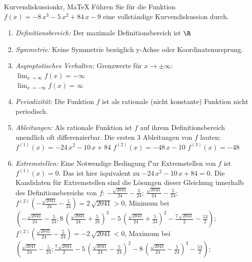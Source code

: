  \providecommand{\MoIl}{(} 
 \providecommand{\MoIr}{)}
 \providecommand{\MIntvlSep}{;} 
 \providecommand{\MElSetSep}{;} 
 \begin{MAufgabe}{Kurvendiskussion}{kr, MaTeX}
 F\"uhren Sie f\"ur die Funktion $f(x)= - 8\, x^3 - 5\, x^2 + 84\, x - 9$ eine vollst\"andige Kurvendiskussion durch.\\ 
 \ifLsg\Loesung
 \begin{enumerate}
 \item \emph{Definitionsbereich:} 
 Der maximale Definitionsbereich ist $\R$\item \emph{Symmetrie:} 
 Keine Symmetrie bez\"uglich y-Achse oder Koordinatenursprung.\item \emph{Asymptotisches Verhalten:} 
 Grenzwerte f\"ur $x\rightarrow \pm \infty$: \\ 
 $\lim_{x\rightarrow \infty} f(x)=- \infty$ \\ 
 $\lim_{x\rightarrow -\infty} f(x)=\infty$ \\ 
 \item \emph{Periodizit\"at:} 
 Die Funktion $f$ ist als rationale (nicht konstante) Funktion nicht periodisch.\item \emph{Ableitungen:} 
 Als rationale Funktion ist $f$ auf ihrem Definitionsbereich unendlich oft differenzierbar. 
 Die ersten 3 Ableitungen von $f$ lauten: \\ 
 $f^{(1)}(x)= - 24\, x^2 - 10\, x + 84$\newline 
  $f^{(2)}(x)= - 48\, x - 10$\newline 
  $f^{(3)}(x)=-48$\newline 
  \item \emph{Extremstellen:} 
 Eine Notwendige Bedingung f"ur Extremstellen von $f$ ist $f^{(1)}(x)=0$. 
 Das ist hier \"aquivalent zu $ - 24\, x^2 - 10\, x + 84=0$. 
 Die Kandidaten f\"ur Extremstellen sind die L\"osungen dieser Gleichung innerhalb des Definitionsbereichs von $f$: $ - \frac{\sqrt{2041}}{24} - \frac{5}{24}$; $\frac{\sqrt{2041}}{24} - \frac{5}{24}$; \\ 
 $f^{(2)}( - \frac{\sqrt{2041}}{24} - \frac{5}{24})=2\, \sqrt{2041}$$>0$, Minimum bei $( - \frac{\sqrt{2041}}{24} - \frac{5}{24};8\, {\left(\frac{\sqrt{2041}}{24} + \frac{5}{24}\right)}^3 - 5\, {\left(\frac{\sqrt{2041}}{24} + \frac{5}{24}\right)}^2 - \frac{7\, \sqrt{2041}}{2} - \frac{53}{2})$; \\ 
 $f^{(2)}(\frac{\sqrt{2041}}{24} - \frac{5}{24})=- 2\, \sqrt{2041}$$<0$, Maximum bei $(\frac{\sqrt{2041}}{24} - \frac{5}{24};\frac{7\, \sqrt{2041}}{2} - 5\, {\left(\frac{\sqrt{2041}}{24} - \frac{5}{24}\right)}^2 - 8\, {\left(\frac{\sqrt{2041}}{24} - \frac{5}{24}\right)}^3 - \frac{53}{2})$; \\ 

\end{enumerate}
\end{MAufgabe}
